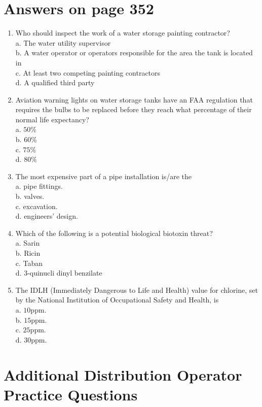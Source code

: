 \documentclass[10pt]{article}
\begin{document}
\section{Answers on page 352}
\begin{enumerate}
  \item Who should inspect the work of a water storage painting contractor?\\
a. The water utility supervisor\\
b. A water operator or operators responsible for the area the tank is located in\\
c. At least two competing painting contractors\\
d. A qualified third party

  \item Aviation warning lights on water storage tanks have an FAA regulation that requires the bulbs to be replaced before they reach what percentage of their normal life expectancy?\\
a. $50 \%$\\
b. $60 \%$\\
c. $75 \%$\\
d. $80 \%$

  \item The most expensive part of a pipe installation is/are the\\
a. pipe fittings.\\
b. valves.\\
c. excavation.\\
d. engineers' design.

  \item Which of the following is a potential biological biotoxin threat?\\
a. Sarin\\
b. Ricin\\
c. Taban\\
d. 3-quinucli dinyl benzilate

  \item The IDLH (Immediately Dangerous to Life and Health) value for chlorine, set by the National Institution of Occupational Safety and Health, is\\
a. $10 \mathrm{ppm}$.\\
b. $15 \mathrm{ppm}$.\\
c. $25 \mathrm{ppm}$.\\
d. $30 \mathrm{ppm}$.

\end{enumerate}

\section{Additional Distribution Operator Practice Questions}
\end{document}
